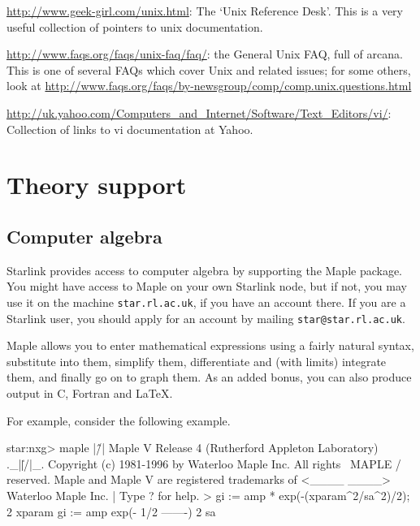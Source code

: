 \documentclass[11pt,oneside,chapters]{starlink}
\begin{document}
\begin{itemize}
\url{http://www.geek-girl.com/unix.html}: The `Unix
Reference Desk'.  This is a very useful collection of
pointers to unix documentation.


\url{http://www.faqs.org/faqs/unix-faq/faq/}:
the General Unix FAQ, full of arcana.  This is one of several FAQs
which cover Unix and related issues; for some others, look at
\url{http://www.faqs.org/faqs/by-newsgroup/comp/comp.unix.questions.html}

\url{http://uk.yahoo.com/Computers_and_Internet/Software/Text_Editors/vi/}:
Collection of links to vi documentation at Yahoo.
\end{itemize}

\chapter{Theory support}
\label{s:theory}

\section{Computer algebra}
\label{s:maple}

Starlink provides access to computer algebra by supporting
the Maple package.  You might have access to Maple on your
own Starlink node, but if not, you may use it on the machine
\texttt{star.rl.ac.uk}, if you have an account there.
If you are a Starlink user, you should apply for an account
by mailing \texttt{star@star.rl.ac.uk}.

Maple allows you to enter mathematical expressions using a
fairly natural syntax, substitute into them, simplify them,
differentiate and (with limits) integrate them, and finally
go on to graph them.  As an added bonus, you can also
produce output in C, Fortran and LaTeX.

For example, consider the following example.

\begin{terminalv}
star:nxg> maple
    |\^/|     Maple V Release 4 (Rutherford Appleton Laboratory)
._|\|   |/|_. Copyright (c) 1981-1996 by Waterloo Maple Inc. All rights
 \  MAPLE  /  reserved. Maple and Maple V are registered trademarks of
 <____ ____>  Waterloo Maple Inc.
      |       Type ? for help.
> gi := amp * exp(-(xparam^2/sa^2)/2);
                                                   2
                                             xparam
                         gi := amp exp(- 1/2 -------)
                                                 2
                                               sa
\end{terminalv}
\end{document}
